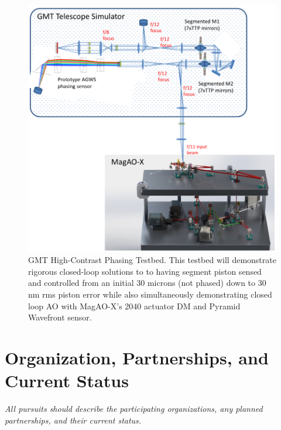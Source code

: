 \documentclass[12pt,preprint]{aastex}
\begin{document}
 \begin{figure} [h!]
\centering
\includegraphics[width=5in]{figures/Testbed_figure.png}
\caption{GMT High-Contrast Phasing Testbed. This testbed will demonstrate rigorous closed-loop solutions to to having segment piston sensed and controlled from an initial 30 microns (not phased) down to 30 nm rms piston error while also simultaneously demonstrating closed loop AO with MagAO-X's 2040 actuator DM and Pyramid Wavefront sensor.  \label{fig:testbed}}
\end{figure}
 


\section{Organization, Partnerships, and Current Status}  
\textit{All pursuits should describe the participating
organizations, any planned partnerships, and their current status.}
\end{document}
